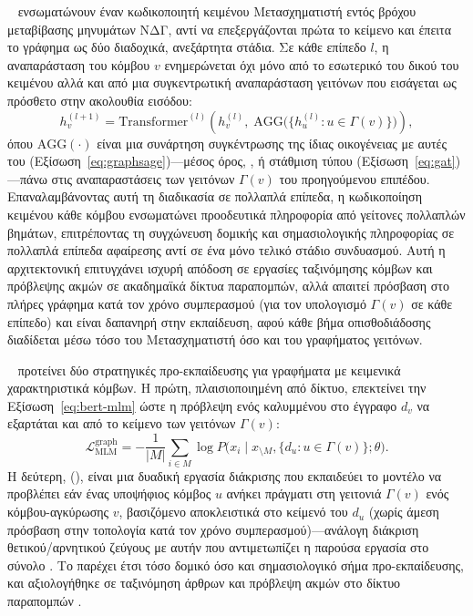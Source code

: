 \textbf{}~\cite{yang2021graphformers} ενσωματώνουν έναν κωδικοποιητή
κειμένου Μετασχηματιστή εντός βρόχου μεταβίβασης μηνυμάτων ΝΔΓ, αντί να
επεξεργάζονται πρώτα το κείμενο και έπειτα το γράφημα ως δύο διαδοχικά, ανεξάρτητα
στάδια.
Σε κάθε επίπεδο $l$, η αναπαράσταση  του κόμβου $v$ ενημερώνεται
όχι μόνο από το εσωτερικό  του δικού του κειμένου αλλά και
από μια συγκεντρωτική αναπαράσταση γειτόνων που εισάγεται ως πρόσθετο
 \en{[GNN]} στην ακολουθία εισόδου:
\begin{equation}
    h_v^{(l+1)} = \mathrm{Transformer}^{(l)}\!\left(h_v^{(l)}, \; \mathrm{AGG}\bigl(\{h_u^{(l)} : u \in \Gamma(v)\}\bigr)\right),
    \label{eq:graphformers-update}
\end{equation}
όπου $\mathrm{AGG}(\cdot)$ είναι μια συνάρτηση συγκέντρωσης της ίδιας οικογένειας με
αυτές του  (Εξίσωση~\ref{eq:graphsage})---μέσος όρος, ,
ή στάθμιση τύπου  (Εξίσωση~\ref{eq:gat})---πάνω στις αναπαραστάσεις των
γειτόνων $\Gamma(v)$ του προηγούμενου επιπέδου.
Επαναλαμβάνοντας αυτή τη διαδικασία σε πολλαπλά επίπεδα, η κωδικοποίηση
κειμένου κάθε κόμβου ενσωματώνει προοδευτικά πληροφορία από γείτονες πολλαπλών
βημάτων, επιτρέποντας τη συγχώνευση δομικής και σημασιολογικής πληροφορίας σε
πολλαπλά επίπεδα αφαίρεσης αντί σε ένα μόνο τελικό στάδιο συνδυασμού.
Αυτή η αρχιτεκτονική επιτυγχάνει ισχυρή απόδοση σε εργασίες ταξινόμησης κόμβων
και πρόβλεψης ακμών σε ακαδημαϊκά δίκτυα παραπομπών, αλλά απαιτεί πρόσβαση στο
πλήρες γράφημα κατά τον χρόνο συμπερασμού (για τον υπολογισμό $\Gamma(v)$ σε κάθε
επίπεδο) και είναι δαπανηρή στην εκπαίδευση, αφού κάθε βήμα οπισθοδιάδοσης
διαδίδεται μέσω τόσο του Μετασχηματιστή όσο και του γραφήματος γειτόνων.

\textbf{}~\cite{jin2023patton} προτείνει δύο στρατηγικές προ-εκπαίδευσης για
γραφήματα με κειμενικά χαρακτηριστικά κόμβων.
Η πρώτη, 
πλαισιοποιημένη από δίκτυο, επεκτείνει την Εξίσωση~\ref{eq:bert-mlm} ώστε η
πρόβλεψη ενός καλυμμένου  στο έγγραφο $d_v$ να εξαρτάται και από το
κείμενο των γειτόνων $\Gamma(v)$:
\begin{equation}
    \mathcal{L}_{\mathrm{MLM}}^{\mathrm{graph}} = -\frac{1}{|M|} \sum_{i \in M} \log P\bigl(x_i \mid x_{\setminus M}, \{d_u : u \in \Gamma(v)\}; \theta\bigr).
    \label{eq:patton-mlm}
\end{equation}
Η δεύτερη,  (), είναι μια
δυαδική εργασία διάκρισης που εκπαιδεύει το μοντέλο να προβλέπει εάν ένας υποψήφιος
κόμβος $u$ ανήκει πράγματι στη γειτονιά $\Gamma(v)$ ενός κόμβου-αγκύρωσης $v$,
βασιζόμενο αποκλειστικά στο κείμενό του $d_u$ (χωρίς άμεση πρόσβαση στην τοπολογία
κατά τον χρόνο συμπερασμού)---ανάλογη διάκριση θετικού/αρνητικού ζεύγους με αυτήν
που αντιμετωπίζει η παρούσα εργασία στο σύνολο .
Το  παρέχει έτσι τόσο δομικό όσο και σημασιολογικό σήμα
προ-εκπαίδευσης, και αξιολογήθηκε σε ταξινόμηση άρθρων και πρόβλεψη ακμών στο
δίκτυο παραπομπών .

